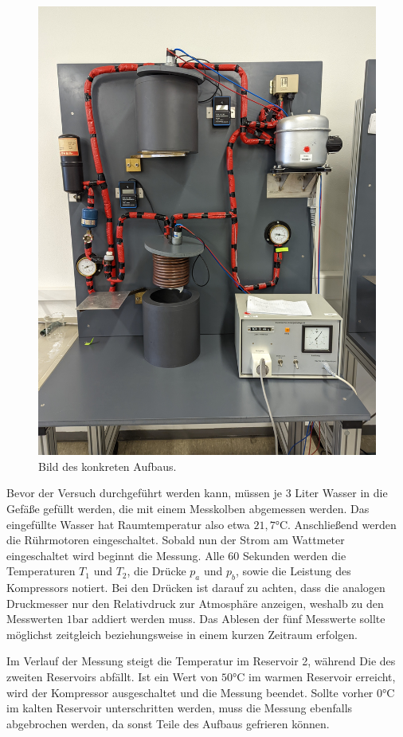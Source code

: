 \begin{figure}
    \centering
    \caption{Bild des konkreten Aufbaus.}
    \label{fig:Aufbau_real}
    \includegraphics[width=.4\textwidth]{content/Gesamtbild.jpg}
\end{figure}

Bevor der Versuch durchgeführt werden kann, müssen je 3 Liter Wasser in die Gefäße gefüllt werden, die mit einem Messkolben abgemessen werden.
Das eingefüllte Wasser hat Raumtemperatur also etwa $21,7 \unit{\degreeCelsius}$.
Anschließend werden die Rührmotoren eingeschaltet. Sobald nun der Strom am Wattmeter eingeschaltet wird beginnt die Messung. Alle 60 Sekunden werden
die Temperaturen $T_1$ und $T_2$, die Drücke $p_a$ und $p_b$, sowie die Leistung des Kompressors notiert. Bei den Drücken ist darauf zu achten, dass die analogen Druckmesser
nur den Relativdruck zur Atmosphäre anzeigen, weshalb zu den Messwerten $1 \unit{\bar}$ addiert werden muss. Das Ablesen der fünf Messwerte sollte möglichst zeitgleich beziehungsweise
in einem kurzen Zeitraum erfolgen.

Im Verlauf der Messung steigt die Temperatur im Reservoir 2, während Die des zweiten Reservoirs abfällt. Ist ein Wert von $50 \unit{\degreeCelsius}$
im warmen Reservoir erreicht, wird der Kompressor ausgeschaltet und die Messung beendet. Sollte vorher $0 \unit{\degreeCelsius}$ im kalten Reservoir unterschritten werden, muss die
Messung ebenfalls abgebrochen werden, da sonst Teile des Aufbaus gefrieren können.
